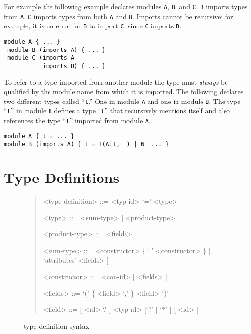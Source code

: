 For example the
following example declares modules \lstinline[language=ASDL]!A!,
\lstinline[language=ASDL]!B!, and \lstinline[language=ASDL]!C!.
\lstinline[language=ASDL]!B! imports types from \lstinline[language=ASDL]!A!.
\lstinline[language=ASDL]!C! imports types from both \lstinline[language=ASDL]!A! and
\lstinline[language=ASDL]!B!.
Imports cannot be recursive; for example, it is an error for \lstinline[language=ASDL]!B! to
import \lstinline[language=ASDL]!C!, since \lstinline[language=ASDL]!C!
imports \lstinline[language=ASDL]!B!.
\begin{code}\begin{lstlisting}[language=ASDL]
 module A { ... } 
 module B (imports A) { ... }
 module C (imports A 
           imports B) { ... }
\end{lstlisting}\end{code}%

To refer to a type imported from another module the type must
\emph{always} be qualified by the module name from which it is
imported.
The following declares two different types called ``\texttt{t}.''
One in module \texttt{A} and one in module \texttt{B}.
The type ``\texttt{t}'' in module \texttt{B} defines a type ``\texttt{t}'' that
recursively mentions itself and also references the type ``\texttt{t}'' imported
from module \texttt{A}.
\begin{code}\begin{lstlisting}[language=ASDL]
module A { t = ... } 
module B (imports A) { t = T(A.t, t) | N  ... }
\end{lstlisting}\end{code}%

\section{Type Definitions}

\begin{figure}[t]
  \begin{quote}
    \begin{grammar}
      <type-definition>  ::=  <typ-id> `=' <type>

      <type>         ::= <sum-type> | <product-type>

      <product-type> ::= <fields>

      <sum-type>     ::= <constructor> \{ `|' <constructor> \} [ `attributes' <fields> ]

      <constructor>  ::= <con-id> [ <fields> ]

      <fields>       ::= `(' \{ <field>  `,' \} <field> `)'

      <field>        ::= [ <id> `.' ] <typ-id> [`?' | `*' ]  [ <id> ]
    \end{grammar}
  \end{quote}
  \caption{\asdl{} type definition syntax}
  \label{fig:type-syntax}
\end{figure}%

